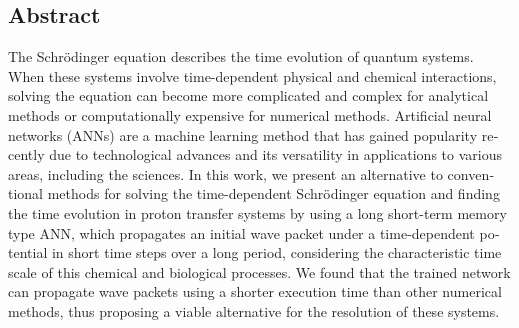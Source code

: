 \begin{otherlanguage}{english}
  \chapter*{Abstract}
  \small
The Schrödinger equation describes the time evolution of quantum systems. When these systems involve time-dependent physical and chemical interactions, solving the equation can become more complicated and complex for analytical methods or computationally expensive for numerical methods. Artificial neural networks (\acs{ANN}s) are a machine learning method that has gained popularity recently due to technological advances and its versatility in applications to various areas, including the sciences. In this work, we present an alternative to conventional methods for solving the time-dependent Schrödinger equation and finding the time evolution in proton transfer systems by using a long short-term memory type \acs{ANN}, which propagates an initial wave packet under a time-dependent potential in short time steps over a long period, considering the characteristic time scale of this chemical and biological processes. We found that the trained network can propagate wave packets using a shorter execution time than other numerical methods, thus proposing a viable alternative for the resolution of these systems.

\end{otherlanguage}

\endgroup

\vfill
